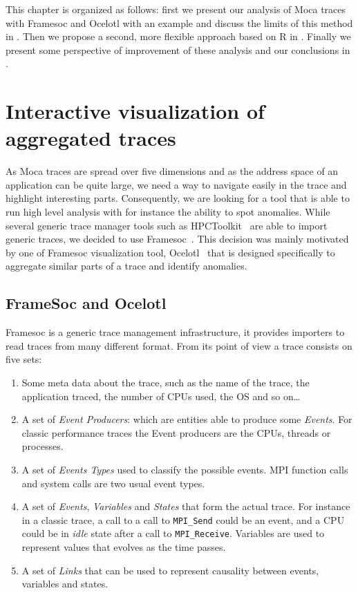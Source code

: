 This chapter is organized as follows: first we present our analysis of \gls{Moca} traces with \gls{Framesoc} and \gls{Ocelotl} with an example and discuss the limits of this method in .
Then we propose a second, more flexible approach based on \gls{R} in .
Finally we present some perspective of improvement of these analysis and our conclusions in .


\section{Interactive visualization of aggregated traces}
\label{sec:visu-first}

As \gls{Moca} traces are spread over five dimensions and as the address space of an application can be quite large, we need a way to navigate easily in the trace and highlight interesting parts.
Consequently, we are looking for a tool that is able to run high level analysis with for instance the ability to spot anomalies.
While several generic trace manager tools such as \gls{HPCToolkit}~\cite{Adhianto10HPCTOOLKIT} are able to import generic traces, we decided to use \gls{Framesoc}~\cite{Pagano14frameSoC}.
This decision was mainly motivated by one of \gls{Framesoc} visualization tool, \gls{Ocelotl}~\cite{Dosimont14Ocelotl} that is designed specifically to aggregate similar parts of a trace and identify anomalies.

\subsection{FrameSoc and Ocelotl}

\gls{Framesoc} is a generic trace management infrastructure, it provides importers to read traces from many different format.
From its point of view a trace consists on five sets:
\begin{enumerate}
    \item Some meta data about the trace, such as the name of the trace, the application traced, the number of \glspl{CPU} used, the \gls{OS} and so on\ldots
    \item A set of \emph{Event Producers}: which are entities able to produce some \emph{Events}.
        For classic performance traces the Event producers are the \glspl{CPU}, threads or processes.
    \item A set of \emph{Events Types} used to classify the possible events.
        \gls{MPI} function calls and system calls are two usual event types.
    \item A set of \emph{Events}, \emph{Variables} and \emph{States} that form the actual trace.
        For instance in a classic trace, a call to a call to \texttt{MPI\_Send} could be an event, and a \gls{CPU} could be in \emph{idle} state after a call to \texttt{MPI\_Receive}.
        Variables are used to represent values that evolves as the time passes.
    \item A set of \emph{Links} that can be used to represent causality between events, variables and states.
\end{enumerate}

